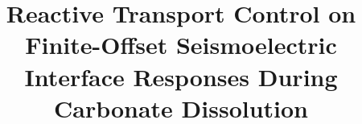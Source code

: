 \documentclass[draft]{agujournal2019}
\begin{document}
%
%


\title{Reactive Transport Control on Finite-Offset Seismoelectric Interface Responses During Carbonate Dissolution}

%
%















\end{document}

